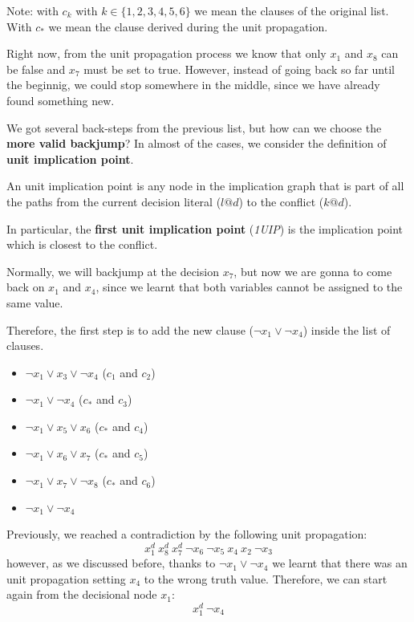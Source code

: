 \begin{example}
    Note: with $c_k$ with $k \in \{1, 2, 3, 4, 5, 6\}$ we mean the clauses of the original list. With $c_*$ we mean the clause derived during the unit propagation. \vspace{7pt}

    Right now, from the unit propagation process we know that only $x_1$ and $x_8$ can be false and $x_7$ must be set to true. However, instead of going 
    back so far until the beginnig, we could stop somewhere in the middle, since we have already found something new. \vspace{7pt}

    We got several back-steps from the previous list, but how can we choose the \textbf{more valid backjump}? In almost of the cases, we consider the definition
    of \textbf{unit implication point}. 
    \begin{definition}
        An unit implication point is any node in the implication graph that is part of all the paths from the current decision literal ($l@d$) to the 
        conflict ($k@d$). \vspace{7pt}

        In particular, the \textbf{first unit implication point} (\textit{1UIP}) is the implication point which is closest to the conflict. 
    \end{definition} 
    Normally, we will backjump at the decision $x_7$, but now we are gonna to come back on $x_1$ and $x_4$, since we learnt that both variables 
    cannot be assigned to the same value. \vspace{7pt}

    Therefore, the first step is to add the new clause ($\neg x_1 \vee \neg x_4$) inside the list of clauses.
    \begin{itemize}
        \renewcommand{\labelitemi}{-}
        \item $\neg x_1 \vee x_3 \vee \neg x_4$ ($c_1$ and $c_2$)
        \item $\neg x_1 \vee \neg x_4$ ($c_*$ and $c_3$)
        \item $\neg x_1 \vee x_5 \vee x_6$ ($c_*$ and $c_4$)
        \item $\neg x_1 \vee x_6 \vee x_7$ ($c_*$ and $c_5$)
        \item $\neg x_1 \vee x_7 \vee \neg x_8$ ($c_*$ and $c_6$)
        \item $\neg x_1 \vee \neg x_4$
    \end{itemize} \vspace{7pt}

    Previously, we reached a contradiction by the following unit propagation:
    $$ x_1^d \ x_8^d \ x_7^d \ \neg x_6 \ \neg x_5 \  x_4 \ x_2 \ \neg x_3 $$
    however, as we discussed before, thanks to $\neg x_1 \vee \neg x_4$ we learnt that there was an unit propagation setting $x_4$ to the wrong truth value.
    Therefore, we can start again from the decisional node $x_1$:
    $$ x_1^d \ \neg x_4$$
\end{example}